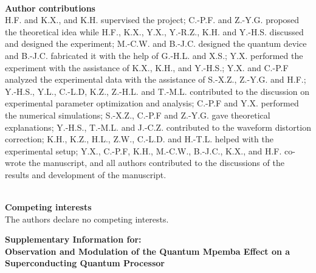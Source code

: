 \documentclass[reprint,superscriptaddress,preprintnumbers,longbibliography,
amsmath,amssymb,aps,floatfix,pra,twocolumn, tightenlines %
]{revtex4-2}
\newcommand{\beginsupplement}{%
    \setcounter{table}{0}
    \renewcommand{\thetable}{S\arabic{table}}%
    \setcounter{figure}{0}
    \renewcommand{\thefigure}{S\arabic{figure}}%
    \setcounter{equation}{0}
    \renewcommand{\theequation}{S\arabic{equation}}%
    \setcounter{section}{0}
    \renewcommand{\thesection}{\arabic{section}}%
   }
\begin{document}
	~\\
    \noindent
    \textbf{Author contributions}\\
    H.F. and K.X., and K.H. supervised the project; C.-P.F. and Z.-Y.G. proposed the theoretical idea while H.F., K.X., Y.X., Y.-R.Z., K.H. and Y.-H.S. discussed and designed the experiment; M.-C.W. and B.-J.C. designed the quantum device and B.-J.C. fabricated it with the help of G.-H.L. and X.S.; Y.X. performed the experiment with the assistance of K.X., K.H., and Y.-H.S.; Y.X. and C.-P.F analyzed the experimental data with the assistance of S.-X.Z., Z.-Y.G. and H.F.; Y.-H.S., Y.L., C.-L.D, K.Z., Z.-H.L. and T.-M.L. contributed to the discussion on experimental parameter optimization and analysis; C.-P.F and Y.X. performed the numerical simulations; S.-X.Z., C.-P.F and Z.-Y.G. gave theoretical explanations; Y.-H.S., T.-M.L. and J.-C.Z. contributed to the waveform distortion correction; K.H., K.Z., H.L., Z.W., C.-L.D. and H.-T.L. helped with the experimental setup; Y.X., C.-P.F, K.H., M.-C.W., B.-J.C., K.X., and H.F. co-wrote the manuscript, and all authors contributed to the discussions of the results and development of the manuscript.

    ~\\
    \noindent
	\textbf{\textbf{Competing interests}}\\
	The authors declare no competing interests.


	\vspace{-1mm}
	
	
	
\clearpage 
\onecolumngrid
\begin{center}
{\large \bf Supplementary Information for:\\ Observation and Modulation of the Quantum Mpemba Effect on a Superconducting Quantum Processor}
\\
\vspace{0.3cm}
\end{center}

\vspace{0.6cm}


\beginsupplement
\makeatletter
\def\@hangfrom@section#1#2#3{\@hangfrom{#1#2#3}}
\makeatother

\setcounter{section}{0}
\renewcommand{\thesection}{Supplementary Note \arabic{section}}
\renewcommand{\figurename}{Supplementary Fig.}
\setcounter{figure}{0}  %
\end{document}
